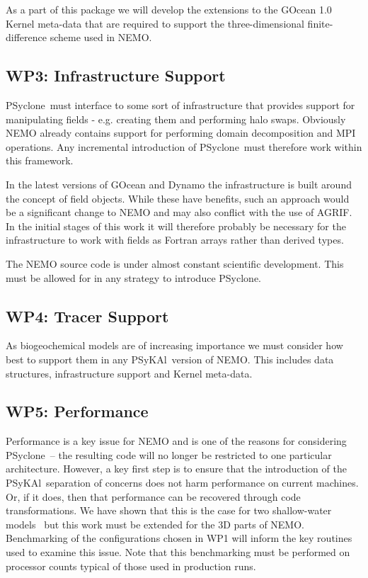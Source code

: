 \documentclass{article}
\newcommand{\psykal}{{PS}y{KA}l}
\newcommand{\psyclone}{{PS}yclone}
\begin{document}
As a part of this package we will develop the extensions to the GOcean
1.0 Kernel meta-data that are required to support the
three-dimensional finite-difference scheme used in NEMO.

\subsection{WP3: Infrastructure Support}
\label{wp3_infrastructure}

\psyclone\ must interface to some sort of infrastructure that provides
support for manipulating fields - e.g. creating them and performing
halo swaps. Obviously NEMO already contains support for performing
domain decomposition and MPI operations. Any incremental introduction
of \psyclone\ must therefore work within this framework.

In the latest versions of GOcean and Dynamo the infrastructure is
built around the concept of field objects. While these have benefits,
such an approach would be a significant change to NEMO and may also
conflict with the use of AGRIF. In the initial stages of this work it
will therefore probably be necessary for the infrastructure to work
with fields as Fortran arrays rather than derived types.

The NEMO source code is under almost constant scientific
development. This must be allowed for in any strategy to introduce
\psyclone.

\subsection{WP4: Tracer Support}
\label{wp4_tracers}

As biogeochemical models are of increasing importance we must consider
how best to support them in any \psykal\ version of NEMO. This
includes data structures, infrastructure support and Kernel meta-data.

\subsection{WP5: Performance}
\label{wp5_perf}

Performance is a key issue for NEMO and is one of the reasons for
considering \psyclone\ -- the resulting code will no longer be
restricted to one particular architecture. However, a key first step
is to ensure that the introduction of the \psykal\ separation of
concerns does not harm performance on current machines. Or, if it
does, then that performance can be recovered through code
transformations. We have shown that this is the case for two
shallow-water models~\cite{psykal_shallow} but this work must be
extended for the 3D parts of NEMO. Benchmarking of the configurations
chosen in WP1 will inform the key routines used to examine this
issue. Note that this benchmarking must be performed on processor
counts typical of those used in production runs.
\end{document}
